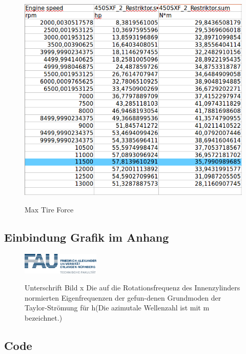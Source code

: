 \begin{figure}[hb!]
	\caption{Max Tire Force}
	\includegraphics[width=350pt]{Abbildungen/Engine_power.png}
	\label{fig:maxTireForce}
\end{figure}



 \subsection*{Einbindung Grafik im Anhang}
  \begin{figure}[h!]
  \begin{centering}
  {\includegraphics[width=0.33\textwidth]{Abbildungen/fau.png}}
   \caption{Unterschrift Bild x Die auf die Rotationsfrequenz des Innenzylinders normierten Eigenfrequenzen der gefun-denen Grundmoden der Taylor-Strömung für h(Die azimutale Wellenzahl ist mit m  bezeichnet.)}
  \end{centering}
  \end{figure}

\subsection{Code}

